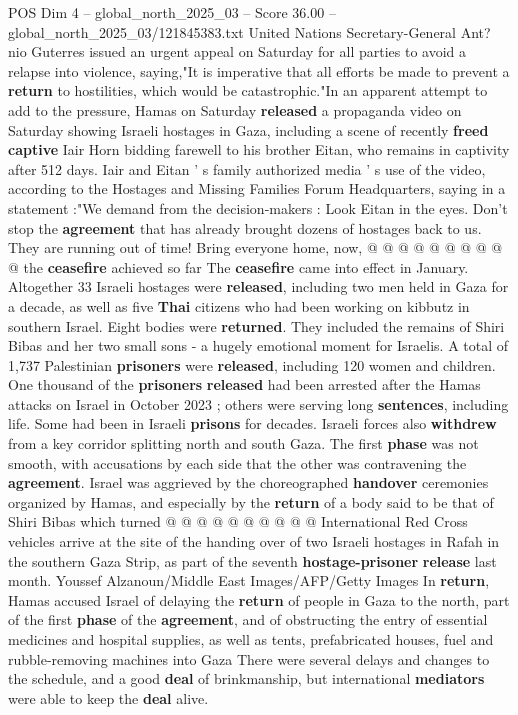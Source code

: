 \begin{textsample}{POS Dim 4 – global\_north\_2025\_03 – Score 36.00 – global\_north\_2025\_03/121845383.txt}
United Nations Secretary-General Ant? nio Guterres issued an urgent appeal on Saturday for all parties to avoid a relapse into violence, saying,"It is imperative that all efforts be made to prevent a \textbf{return} to hostilities, which would be catastrophic."In an apparent attempt to add to the pressure, Hamas on Saturday \textbf{released} a propaganda video on Saturday showing Israeli hostages in Gaza, including a scene of recently \textbf{freed} \textbf{captive} Iair Horn bidding farewell to his brother Eitan, who remains in captivity after 512 days.
Iair and Eitan ' s family authorized media ' s use of the video, according to the Hostages and Missing Families Forum Headquarters, saying in a statement :"We demand from the decision-makers : Look Eitan in the eyes.
Don't stop the \textbf{agreement} that has already brought dozens of hostages back to us.
They are running out of time!
Bring everyone home, now, @ @ @ @ @ @ @ @ @ @ the \textbf{ceasefire} achieved so far The \textbf{ceasefire} came into effect in January.
Altogether 33 Israeli hostages were \textbf{released}, including two men held in Gaza for a decade, as well as five \textbf{Thai} citizens who had been working on kibbutz in southern Israel.
Eight bodies were \textbf{returned}.
They included the remains of Shiri Bibas and her two small sons - a hugely emotional moment for Israelis.
A total of 1,737 Palestinian \textbf{prisoners} were \textbf{released}, including 120 women and children.
One thousand of the \textbf{prisoners} \textbf{released} had been arrested after the Hamas attacks on Israel in October 2023 ; others were serving long \textbf{sentences}, including life.
Some had been in Israeli \textbf{prisons} for decades.
Israeli forces also \textbf{withdrew} from a key corridor splitting north and south Gaza.
The first \textbf{phase} was not smooth, with accusations by each side that the other was contravening the \textbf{agreement}.
Israel was aggrieved by the choreographed \textbf{handover} ceremonies organized by Hamas, and especially by the \textbf{return} of a body said to be that of Shiri Bibas which turned @ @ @ @ @ @ @ @ @ @ International Red Cross vehicles arrive at the site of the handing over of two Israeli hostages in Rafah in the southern Gaza Strip, as part of the seventh \textbf{hostage-prisoner} \textbf{release} last month.
Youssef Alzanoun/Middle East Images/AFP/Getty Images In \textbf{return}, Hamas accused Israel of delaying the \textbf{return} of people in Gaza to the north, part of the first \textbf{phase} of the \textbf{agreement}, and of obstructing the entry of essential medicines and hospital supplies, as well as tents, prefabricated houses, fuel and rubble-removing machines into Gaza There were several delays and changes to the schedule, and a good \textbf{deal} of brinkmanship, but international \textbf{mediators} were able to keep the \textbf{deal} alive.

\end{textsample}
